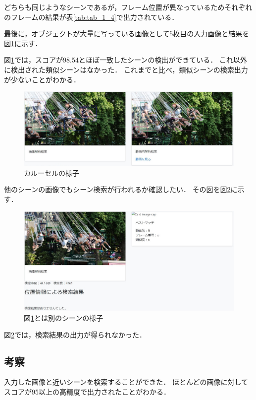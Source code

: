 \documentclass[a4j,12pt,dvipdfmx]{jreport}
\begin{document}
どちらも同じようなシーンであるが，フレーム位置が異なっているためそれぞれのフレームの結果が表\ref{tab:tab_1_4}で出力されている．


最後に，オブジェクトが大量に写っている画像として5枚目の入力画像と結果を図\ref{fig:img_1_5}に示す．

図\ref{fig:img_1_5}では，スコアが98.54とほぼ一致したシーンの検出ができている．
これ以外に検出された類似シーンはなかった．
これまでと比べ，類似シーンの検索出力が少ないことがわかる．
\begin{figure}[t]
  \centering
  \includegraphics[width=13cm]{image/result_1_5.jpg}
  \caption{カルーセルの様子}
  \label{fig:img_1_5}
\end{figure}

他のシーンの画像でもシーン検索が行われるか確認したい．
その図を図\ref{fig:img_1_5_1}に示す．
\begin{figure}[t]
  \centering
  \includegraphics[width=13cm]{image/result_1_5_1.jpg}
  \caption{図\ref{fig:img_1_5}とは別のシーンの様子}
  \label{fig:img_1_5_1}
\end{figure}

図\ref{fig:img_1_5_1}では，検索結果の出力が得られなかった．

\subsection{考察}\label{chap4-2-1}
入力した画像と近いシーンを検索することができた．
ほとんどの画像に対してスコアが95以上の高精度で出力されたことがわかる．
\end{document}
